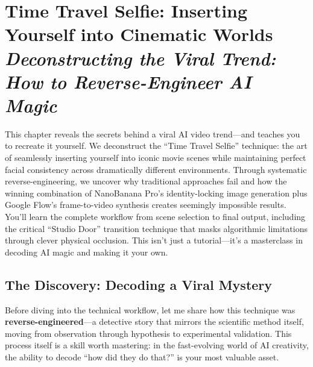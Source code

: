 \chapter[Time Travel Selfie]{Time Travel Selfie: Inserting Yourself into Cinematic Worlds\\[0.5em]\large\textit{Deconstructing the Viral Trend: How to Reverse-Engineer AI Magic}}
\label{ch:time-travel-selfie}

\begin{chapterabstract}
This chapter reveals the secrets behind a viral AI video trend—and teaches you to recreate it yourself. We deconstruct the ``Time Travel Selfie'' technique: the art of seamlessly inserting yourself into iconic movie scenes while maintaining perfect facial consistency across dramatically different environments. Through systematic reverse-engineering, we uncover why traditional approaches fail and how the winning combination of NanoBanana Pro's identity-locking image generation plus Google Flow's frame-to-video synthesis creates seemingly impossible results. You'll learn the complete workflow from scene selection to final output, including the critical ``Studio Door'' transition technique that masks algorithmic limitations through clever physical occlusion. This isn't just a tutorial—it's a masterclass in decoding AI magic and making it your own.
\end{chapterabstract}

\begin{center}
\end{center}

\vspace{1em}

\section{The Discovery: Decoding a Viral Mystery}
\label{sec:discovery}

Before diving into the technical workflow, let me share how this technique was \textbf{reverse-engineered}—a detective story that mirrors the scientific method itself, moving from observation through hypothesis to experimental validation. This process itself is a skill worth mastering: in the fast-evolving world of AI creativity, the ability to decode ``how did they do that?'' is your most valuable asset.

